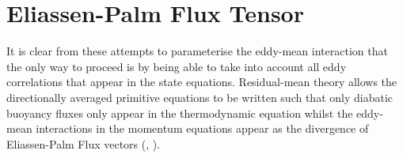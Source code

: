 \documentclass[12pt,a4paper]{report}
\begin{document}
                \section{Eliassen-Palm Flux Tensor}
                
                It is clear from these attempts to parameterise the eddy-mean interaction
                that the only way to proceed is by being able to take into account 
                all eddy correlations that appear in the state equations. Residual-mean theory
                allows the directionally averaged primitive equations to be written such that 
                only diabatic buoyancy
                fluxes only appear in the thermodynamic equation whilst the eddy-mean
                interactions in the momentum equations appear as the divergence of Eliassen-Palm 
                Flux vectors (\cite{eliassen1961transfer}, \cite{andrews1976planetary}). 
                
\end{document}

